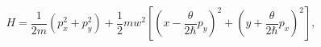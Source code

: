 \begin{equation}
H=\frac{1}{2m}\left(  p_{x}^{2}+p_{y}^{2}\right)  +\frac{1}{2}mw^{2}\left[
\left(  x-\frac{\theta}{2\hbar}p_{y}\right)  ^{2}+\left(  y+\frac{\theta
}{2\hbar}p_{x}\right)  ^{2}\right]  ,\label{45}%
\end{equation}

